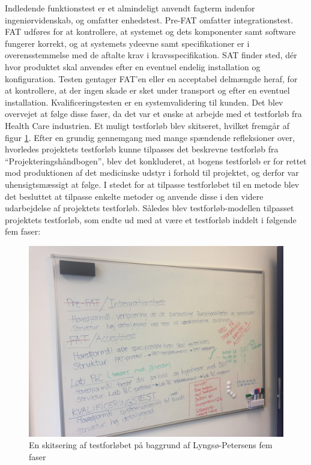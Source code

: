Indledende funktionstest er et almindeligt anvendt fagterm indenfor ingeniørvidenskab, og omfatter enhedstest. Pre-FAT omfatter integrationstest. FAT udføres for at kontrollere, at systemet og dets komponenter samt software fungerer korrekt, og at systemets ydeevne samt specifikationer er i overensstemmelse med de aftalte krav i kravsspecifikation. SAT finder sted, dér hvor produktet skal anvendes efter en eventuel endelig installation og konfiguration. Testen gentager FAT'en eller en acceptabel delmængde heraf, for at kontrollere, at der ingen skade er sket under transport og efter en eventuel installation. Kvalificeringstesten er en systemvalidering til kunden.   
Det blev overvejet at følge disse faser, da det var et ønske at arbejde med et testforløb fra Health Care industrien. Et muligt testforløb blev skitseret, hvilket fremgår af figur \ref{fig:testskitse}. Efter en grundig gennemgang med mange spændende refleksioner over, hvorledes projektets testforløb kunne tilpasses det beskrevne testforløb fra “Projekteringshåndbogen”, blev det konkluderet, at bogens testforløb er for rettet mod produktionen af det medicinske udstyr i forhold til projektet, og derfor var uhensigtsmæssigt at følge. I stedet for at tilpasse testforløbet til en metode blev det besluttet at tilpasse enkelte metoder og anvende disse i den videre udarbejdelse af projektets testforløb. Således blev testforløb-modellen tilpasset projektets testforløb, som endte ud med at være et testforløb inddelt i følgende fem faser:  

\begin{figure}[htb]
\centering	
\includegraphics[width=5in]{testskitse.jpg}
\caption{En skitsering af testforløbet på baggrund af Lyngsø-Petersens fem faser}
\label{fig:testskitse}
\end{figure}

